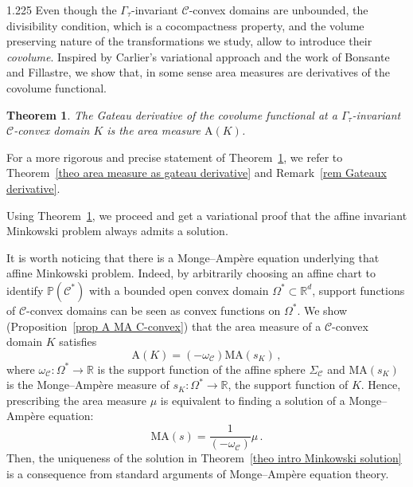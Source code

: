 \documentclass[reqno, a4paper]{amsart}
\numberwithin{equation}{section}
\numberwithin{figure}{section}
\newtheorem{maintheorem}{Theorem}
\theoremstyle{definition}
\theoremstyle{remark}
\newcommand{\R}{\mathbb{R}} %
\renewcommand{\P}{\mathbb{P}} %
\newcommand{\C}{\mathcal{C}} %
\renewcommand{\S}{\Sigma_\C} %
\newcommand{\Area}{\mathrm{A}} %
\newcommand{\MA}{\mathrm{MA}} %
\begin{document}
\begin{spacing}{1.225}
Even though  the $\Gamma_\tau$-invariant $\C$-convex domains are unbounded, the divisibility condition, which is a cocompactness property, and the volume preserving nature of the transformations we study, allow to introduce their \emph{covolume}. Inspired by Carlier's variational approach and the work of Bonsante and Fillastre, we show that, in some sense area measures are derivatives of the covolume functional.

\begin{maintheorem}
\label{theo intro derivative covol}
The Gateau derivative of the covolume functional at a $\Gamma_\tau$-invariant $\C$-convex domain $K$ is the area measure $\Area(K)$. 
\end{maintheorem}

For a more rigorous and precise statement of Theorem~\ref{theo intro derivative covol}, we refer to Theorem~\ref{theo area measure as gateau derivative} and Remark~\ref{rem Gateaux derivative}. 

Using Theorem~\ref{theo intro derivative covol}, we proceed and get a variational proof that the affine invariant Minkowski problem always admits a solution.

It is worth noticing that there is a Monge--Amp\`ere equation underlying that affine Minkowski problem. Indeed, by arbitrarily choosing an affine chart to identify $\P(\C^*)$ with a bounded open convex domain $\Omega^* \subset \R^d$, support functions of $\C$-convex domains can be seen as convex functions on $\Omega^*$. We show (Proposition~\ref{prop A MA C-convex}) that the area measure of a $\C$-convex domain $K$ satisfies 
\begin{equation*}
    \Area(K) = (-\omega_\C) \MA(s_K) \, ,
\end{equation*}
where $\omega_\C : \Omega^* \to \R$ is the support function of the affine sphere $\S$ and $\MA(s_K)$ is the Monge--Amp\`ere measure of $s_K : \Omega^* \to \R$, the support function of $K$. Hence, prescribing the area measure $\mu$ is equivalent to finding a solution of a Monge--Amp\`ere equation:
\begin{equation*}
    \MA(s) = \frac{1}{(-\omega_\C)} \mu\, .
\end{equation*}
Then, the uniqueness of the solution in Theorem~\ref{theo intro Minkowski solution} is a consequence from standard arguments of Monge--Amp\`ere equation theory. 



\end{spacing}
\end{document}
